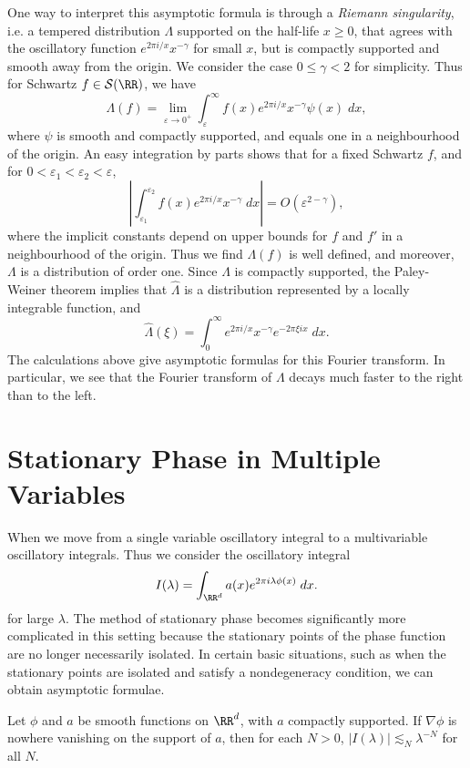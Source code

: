 \begin{example}
  One way to interpret this asymptotic formula is through a \emph{Riemann singularity}, i.e. a tempered distribution $\Lambda$ supported on the half-life $x \geq 0$, that agrees with the oscillatory function $e^{2 \pi i/x} x^{-\gamma}$ for small $x$, but is compactly supported and smooth away from the origin. We consider the case $0 \leq \gamma < 2$ for simplicity. Thus for Schwartz $f \in \mathcal{S}(\RR)$, we have
  \[ \Lambda(f) = \lim_{\varepsilon \to 0^+} \int_\varepsilon^\infty f(x) e^{2 \pi i/x} x^{-\gamma} \psi(x)\; dx, \]
  where $\psi$ is smooth and compactly supported, and equals one in a neighbourhood of the origin. An easy integration by parts shows that for a fixed Schwartz $f$, and for $0 < \varepsilon_1 < \varepsilon_2 < \varepsilon$,
  \[ \left| \int_{\varepsilon_1}^{\varepsilon_2} f(x) e^{2 \pi i/x} x^{-\gamma}\; dx \right| = O\left(\varepsilon^{2-\gamma} \right), \]
  where the implicit constants depend on upper bounds for $f$ and $f'$ in a neighbourhood of the origin. Thus we find $\Lambda(f)$ is well defined, and moreover, $\Lambda$ is a distribution of order one. Since $\Lambda$ is compactly supported, the Paley-Weiner theorem implies that $\widehat{\Lambda}$ is a distribution represented by a locally integrable function, and
  \[ \widehat{\Lambda}(\xi) = \int_0^\infty e^{2 \pi i/x} x^{-\gamma} e^{-2 \pi \xi i x}\; dx. \]
  The calculations above give asymptotic formulas for this Fourier transform. In particular, we see that the Fourier transform of $\Lambda$ decays much faster to the right than to the left.
\end{example}

\section{Stationary Phase in Multiple Variables}

When we move from a single variable oscillatory integral to a multivariable oscillatory integrals. Thus we consider the oscillatory integral
%
\[ I(\lambda) = \int_{\RR^d} a(x) e^{2 \pi i \lambda \phi(x)}\; dx. \]
%
for large $\lambda$. The method of stationary phase becomes significantly more complicated in this setting because the stationary points of the phase function are no longer necessarily isolated. In certain basic situations, such as when the stationary points are isolated and satisfy a nondegeneracy condition, we can obtain asymptotic formulae.

\begin{theorem}
  Let $\phi$ and $a$ be smooth functions on $\RR^d$, with $a$ compactly supported. If $\nabla \phi$ is nowhere vanishing on the support of $a$, then for each $N > 0$, $|I(\lambda)| \lesssim_N \lambda^{-N}$ for all $N$.
\end{theorem}

